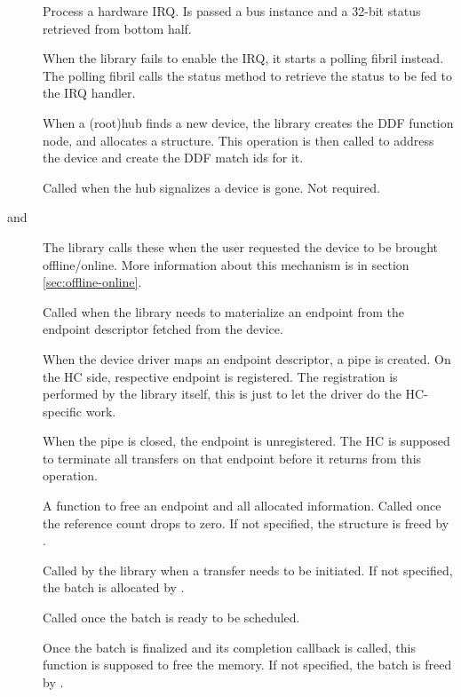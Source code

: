 \begin{description}
	\item[]
		Process a hardware IRQ. Is passed a bus instance and a 32-bit status
		retrieved from bottom half.
	\item[]
		When the library fails to enable the IRQ, it starts a polling fibril
		instead. The polling fibril calls the status method to retrieve the
		status to be fed to the IRQ handler.

	\item[]
		When a (root)hub finds a new device, the library creates the DDF
		function node, and allocates a  structure. This
		operation is then called to address the device and create the DDF match
		ids for it.
	\item[]
		Called when the hub signalizes a device is gone. Not required.
	\item[ and ]
		The library calls these when the user requested the device to be brought
		offline/online. More information about this mechanism is in section
		\ref{sec:offline-online}.

	\item[]
		Called when the library needs to materialize an endpoint from the
		endpoint descriptor fetched from the device.
	\item[]
		When the device driver maps an endpoint descriptor, a pipe is created.
		On the HC side, respective endpoint is registered. The registration
		is performed by the library itself, this is just to let the driver do
		the HC-specific work.
	\item[]
		When the pipe is closed, the endpoint is unregistered. The HC is
		supposed to terminate all transfers on that endpoint before it returns
		from this operation.
	\item[]
		A function to free an endpoint and all allocated information. Called
		once the reference count drops to zero. If not specified, the structure
		is freed by .

	\item[]
		Called by the library when a transfer needs to be initiated. If not
		specified, the batch is allocated by .
	\item[]
		Called once the batch is ready to be scheduled.
	\item[]
		Once the batch is finalized and its completion callback is called, this
		function is supposed to free the memory. If not specified, the batch is freed by .
\end{description}

